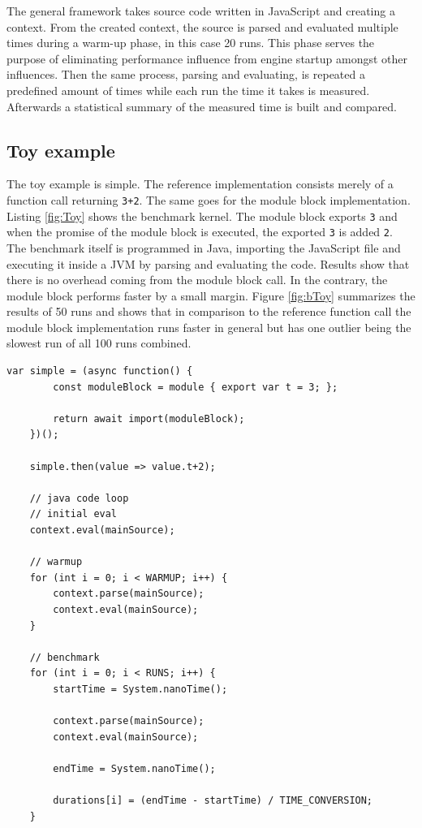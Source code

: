 The general framework takes source code written in JavaScript and creating a context. From the created context, the source is parsed and evaluated multiple times during a warm-up phase, in this case 20 runs. This phase serves the purpose of eliminating performance influence from engine startup amongst other influences. Then the same process, parsing and evaluating, is repeated a predefined amount of times while each run the time it takes is measured. Afterwards a statistical summary of the measured time is built and compared.

\subsection{Toy example}
The toy example is simple. The reference implementation consists merely of a function call returning \texttt{3+2}. The same goes for the module block implementation. Listing \ref{fig:Toy} shows the benchmark kernel. The module block exports \texttt{3} and when the promise of the module block is executed, the exported \texttt{3} is added \texttt{2}. The benchmark itself is programmed in Java, importing the JavaScript file and executing it inside a JVM by parsing and evaluating the code. Results show that there is no overhead coming from the module block call. In the contrary, the module block performs faster by a small margin. Figure \ref{fig:bToy} summarizes the results of 50 runs and shows that in comparison to the reference function call the module block implementation runs faster in general but has one outlier being the slowest run of all 100 runs combined.

\begin{lstlisting}[caption={Module block toy example}, label={fig:Toy}]
     var simple = (async function() {
        const moduleBlock = module { export var t = 3; };
        
        return await import(moduleBlock);
    })();
    
    simple.then(value => value.t+2);
    
    // java code loop
    // initial eval
    context.eval(mainSource);
    
    // warmup
    for (int i = 0; i < WARMUP; i++) {
        context.parse(mainSource);
        context.eval(mainSource);
    }
    
    // benchmark
    for (int i = 0; i < RUNS; i++) {
        startTime = System.nanoTime();
        
        context.parse(mainSource);
        context.eval(mainSource);
        
        endTime = System.nanoTime();
        
        durations[i] = (endTime - startTime) / TIME_CONVERSION;
    }
\end{lstlisting}

